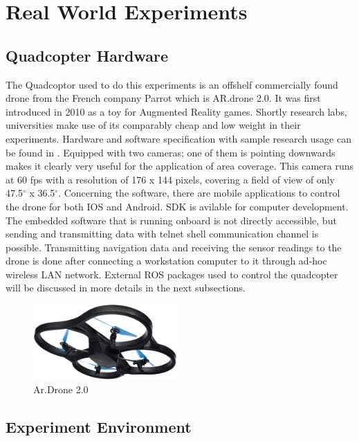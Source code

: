 \section{Real World Experiments} \label{real_robot}

\subsection{Quadcopter Hardware}\label{real_robot_hardware}

The Quadcoptor used to do this experiments is an offshelf commercially found drone from the French company Parrot which is AR.drone 2.0. It was first introduced in 2010 as a toy for Augmented Reality games. Shortly research labs, universities make use of its comparably cheap and low weight in their experiments. Hardware and software specification with sample research usage can be found in \cite{Ardrone1,Ardrone2}. Equipped with two cameras; one of them is pointing downwards makes it clearly very useful for the application of area coverage. This camera runs at 60 fps with a resolution of 176 x 144 pixels, covering a field of view of only 47.5$^{\circ}$ x 36.5$^{\circ}$. Concerning the software, there are mobile applications to control the drone for both IOS and Android. SDK is avilable for computer development. The embedded software that is running onboard is not directly accessible, but sending and transmitting data with telnet shell communication channel is possible. Transmitting navigation data and receiving the sensor readings to the drone is done after connecting a workstation computer to it through ad-hoc wireless LAN network. External ROS packages used to control the quadcopter will be discussed in more details in the next subsections.

\begin{figure}[H]
\center
\includegraphics[width=0.49\textwidth]{figures/ar_drone.png}
 \caption{ Ar.Drone 2.0}
 \end{figure}
 
\subsection{Experiment Environment}

